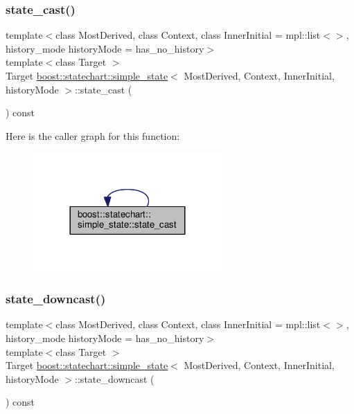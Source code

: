 \subsubsection{\texorpdfstring{state\+\_\+cast()}{state\_cast()}}
{\footnotesize\ttfamily template$<$class Most\+Derived, class Context, class Inner\+Initial = mpl\+::list$<$$>$, history\+\_\+mode history\+Mode = has\+\_\+no\+\_\+history$>$ \\
template$<$class Target $>$ \\
Target \mbox{\hyperlink{classboost_1_1statechart_1_1simple__state}{boost\+::statechart\+::simple\+\_\+state}}$<$ Most\+Derived, Context, Inner\+Initial, history\+Mode $>$\+::state\+\_\+cast (\begin{DoxyParamCaption}{ }\end{DoxyParamCaption}) const\hspace{0.3cm}{\ttfamily [inline]}}

Here is the caller graph for this function\+:
\nopagebreak
\begin{figure}[H]
\begin{center}
\leavevmode
\includegraphics[width=204pt]{classboost_1_1statechart_1_1simple__state_aa94dea47fe6c47cdd5a3585be5db75a0_icgraph}
\end{center}
\end{figure}
\mbox{\label{classboost_1_1statechart_1_1simple__state_aa7af8e560ba3ad0f9d158b9c1188109f}} 
\subsubsection{\texorpdfstring{state\+\_\+downcast()}{state\_downcast()}}
{\footnotesize\ttfamily template$<$class Most\+Derived, class Context, class Inner\+Initial = mpl\+::list$<$$>$, history\+\_\+mode history\+Mode = has\+\_\+no\+\_\+history$>$ \\
template$<$class Target $>$ \\
Target \mbox{\hyperlink{classboost_1_1statechart_1_1simple__state}{boost\+::statechart\+::simple\+\_\+state}}$<$ Most\+Derived, Context, Inner\+Initial, history\+Mode $>$\+::state\+\_\+downcast (\begin{DoxyParamCaption}{ }\end{DoxyParamCaption}) const\hspace{0.3cm}{\ttfamily [inline]}}

